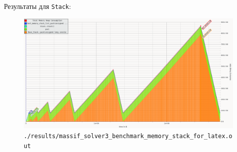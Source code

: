 Результаты для \texttt{Stack}:
\begin{figure}[H]
  \centering
  \includegraphics[width=1.0\textwidth]{../../resources/memory_consumption_of_solver3_benchmark_memory_stack_with_list_1.png}
  \caption{\texttt{./results/massif_solver3_benchmark_memory_stack_for_latex.out}}
\end{figure}

